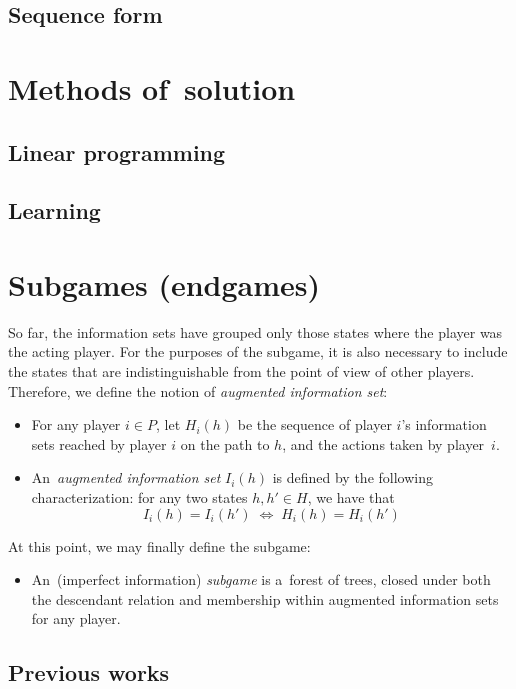 \subsection{Sequence form}

\section{Methods of~solution}

\subsection{Linear programming}

\subsection{Learning}

\section{Subgames (endgames)}

So far, the information sets have grouped only those states where the player was the acting player.
For the purposes of the subgame, it is also necessary to include the states that are indistinguishable from the point of view of other players.
Therefore, we define the notion of \emph{augmented information set}:~\cite{BurchJohansonBowling13}

\begin{itemize}
  \item For any player $i \in P$, let $H_i(h)$ be the sequence of player $i$'s information sets reached by player $i$ on the path to $h$, and the actions taken by player~$i$.
  \item An~\emph{augmented information set} $I_i(h)$ is defined by the following characterization:
    for any two states $h, h' \in H$, we have that 
    \[ I_i (h) = I_i (h') \; \Longleftrightarrow \; H_i (h) = H_i (h') \]
\end{itemize}

At this point, we may finally define the subgame:

\begin{itemize}
  \item An~(imperfect information) \emph{subgame} is a~forest of trees, closed under both the descendant relation and membership within augmented information sets for any player.~\cite{BurchJohansonBowling13}
\end{itemize}

\subsection{Previous works}
